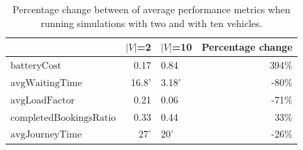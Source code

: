 \documentclass[12pt,a4paper]{article}
\begin{document}
\begin{table}[h]
\center
    \begin{tabular}{|l|r|l|r|}
      \toprule
    & $|V|$=2 & $|V|$=10 & Percentage change\\
    \midrule
    $\text{batteryCost}$ & 0.17 & 0.84 & 394\%\\
    $\text{avgWaitingTime}$ & 16.8' & 3.18' & -80\% \\
    $\text{avgLoadFactor}$ & 0.21 & 0.06 & -71\% \\
    $\text{completedBookingsRatio}$ & 0.33 & 0.44 & 33\% \\
    $\text{avgJourneyTime}$ & 27' & 20' & -26\% \\
    \midrule
    \end{tabular}
    \label{percentagechangeaverages}
    \caption{Percentage change between of average performance metrics when running simulations with two and with ten vehicles.}
  \end{table}
  
\end{document}
